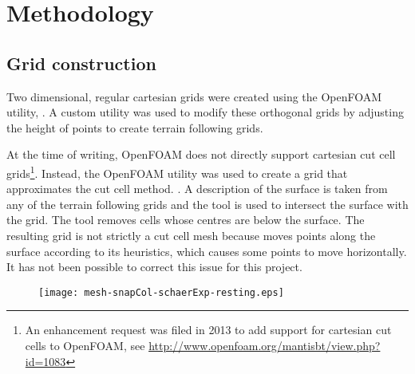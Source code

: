 \chapter{Methodology}

\section{Grid construction}
Two dimensional, regular cartesian grids were created using the OpenFOAM utility, .  A custom utility was used to modify these orthogonal grids by adjusting the height of points to create terrain following grids.

At the time of writing, OpenFOAM does not directly support cartesian cut cell grids\footnote{An enhancement request was filed in 2013 to add support for cartesian cut cells to OpenFOAM, see \url{http://www.openfoam.org/mantisbt/view.php?id=1083}}.  Instead, the  OpenFOAM utility was used to create a grid that approximates the cut cell method.  .  A description of the surface is taken from any of the terrain following grids and the tool is used to intersect the surface with the grid.  The tool removes cells whose centres are below the surface.  The resulting grid is not strictly a cut cell mesh because  moves points along the surface according to its heuristics, which causes some points to move horizontally.  It has not been possible to correct this issue for this project.

\begin{figure}
	\centerfloat
	\texttt{[image: mesh-snapCol-schaerExp-resting.eps]}
	\caption{}
	\label{fig:method:cut-cell}
\end{figure}

